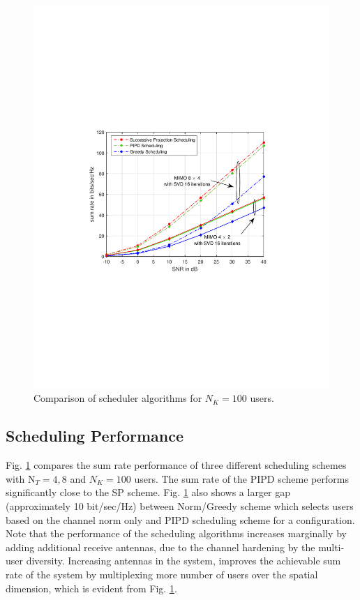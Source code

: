 \documentclass[conference,letterpaper]{./../../IEEE/IEEEtran}
\begin{document}
\begin{figure}
	\centering
	\includegraphics[trim=1.5in 3.5in 1.5in 3.5in,width=\columnwidth]{sra_100}
	\caption{Comparison of scheduler algorithms for $N_K = 100$ users.}
	\label{kuva:performance_plot}
	\vspace{-0.15in}
\end{figure}

\subsection{Scheduling Performance}
Fig. \ref{kuva:performance_plot} compares the sum rate performance of three different scheduling schemes with $\textrm{N}_T = 4,8$ and $N_K = 100$ users. The sum rate of the PIPD scheme performs significantly close to the SP scheme. Fig. \ref{kuva:performance_plot} also shows a larger gap (approximately 10 bit/sec/Hz) between Norm/Greedy scheme which selects users based on the channel norm only and PIPD scheduling scheme for a  configuration. Note that the performance of the scheduling algorithms increases marginally by adding additional receive antennas, due to the channel hardening by the multi-user diversity. Increasing  antennas in the system, improves the achievable sum rate of the system by multiplexing more number of users over the spatial dimension, which is evident from Fig. \ref{kuva:performance_plot}.
\end{document}
